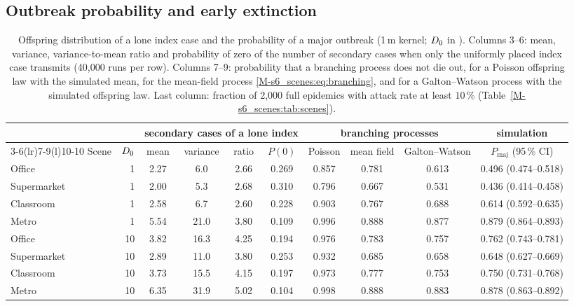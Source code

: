 \subsection{Outbreak probability and early extinction}\label{s6_scenes:sec:pmajor}

\begin{table}[tbp]
\centering
\caption{Offspring distribution of a lone index case and the probability of a major outbreak (1\,m kernel;
$D_0$ in \cdunit{}). Columns 3--6: mean, variance, variance-to-mean ratio and probability of zero of the
number of secondary cases when only the uniformly placed index case transmits (40{,}000 runs per row). Columns
7--9: probability that a branching process does not die out, for a Poisson offspring law with the simulated
mean, for the mean-field process \eqref{M-s6_scenes:eq:branching}, and for a Galton--Watson process with the
simulated offspring law. Last column: fraction of 2{,}000 full epidemics with attack rate at least $10\,\%$
(Table~\ref{M-s6_scenes:tab:scenes}).}
\label{s6_scenes:tab:pmajor}
\footnotesize
\setlength{\tabcolsep}{4pt}
\begin{tabular}{@{}lrcccccccc@{}}
\toprule
 & & \multicolumn{4}{c}{secondary cases of a lone index} & \multicolumn{3}{c}{branching processes} & simulation\\
\cmidrule(lr){3-6}\cmidrule(lr){7-9}\cmidrule(l){10-10}
Scene & $D_0$ & mean & variance & ratio & $P(0)$ & Poisson & mean field & Galton--Watson & $P_{\mathrm{maj}}$ (95\,\% CI)\\
\midrule
Office & 1 & 2.27 & 6.0 & 2.66 & 0.269 & 0.857 & 0.781 & 0.613 & 0.496 (0.474--0.518)\\
Supermarket & 1 & 2.00 & 5.3 & 2.68 & 0.310 & 0.796 & 0.667 & 0.531 & 0.436 (0.414--0.458)\\
Classroom & 1 & 2.58 & 6.7 & 2.60 & 0.228 & 0.903 & 0.767 & 0.688 & 0.614 (0.592--0.635)\\
Metro & 1 & 5.54 & 21.0 & 3.80 & 0.109 & 0.996 & 0.888 & 0.877 & 0.879 (0.864--0.893)\\
\addlinespace
Office & 10 & 3.82 & 16.3 & 4.25 & 0.194 & 0.976 & 0.783 & 0.757 & 0.762 (0.743--0.781)\\
Supermarket & 10 & 2.89 & 11.0 & 3.80 & 0.253 & 0.932 & 0.685 & 0.658 & 0.648 (0.627--0.669)\\
Classroom & 10 & 3.73 & 15.5 & 4.15 & 0.197 & 0.973 & 0.777 & 0.753 & 0.750 (0.731--0.768)\\
Metro & 10 & 6.35 & 31.9 & 5.02 & 0.104 & 0.998 & 0.888 & 0.883 & 0.878 (0.863--0.892)\\
\bottomrule
\end{tabular}
\end{table}

